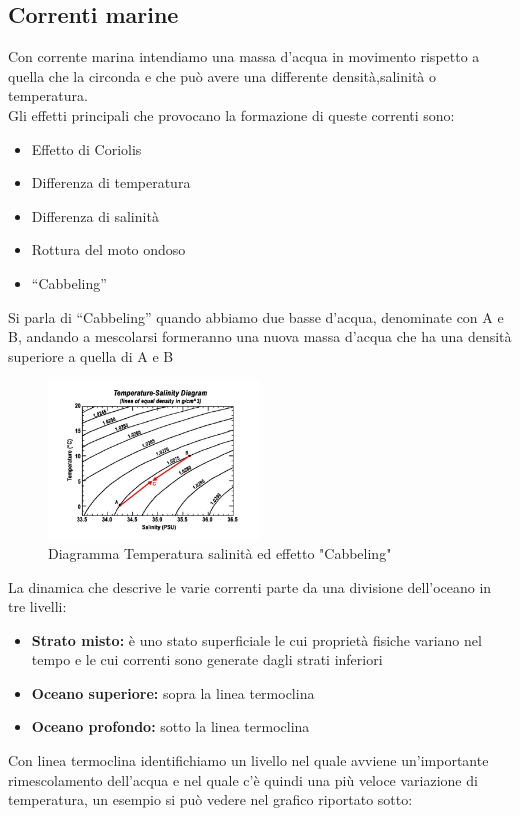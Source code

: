 \subsection{Correnti marine}
Con corrente marina intendiamo una massa d'acqua in movimento rispetto a quella che la circonda e che può avere una differente densità,salinità o temperatura.\\
Gli effetti principali che provocano la formazione di queste correnti sono:\cite{NOAA-current}
\begin{itemize}
    \item Effetto di Coriolis
    \item Differenza di temperatura
    \item Differenza di salinità
    \item Rottura del moto ondoso
    \item \enquote{Cabbeling}
\end{itemize}\noindent
Si parla di \enquote{Cabbeling} quando abbiamo due basse d'acqua, denominate con A e B, andando a mescolarsi formeranno una nuova massa d'acqua che ha una densità superiore a quella di A e B
\begin{figure}[H]
    \centering
    \includegraphics[width=0.5\textwidth]{res/cap 2/temperature-salinity}
    \caption{Diagramma Temperatura salinità ed effetto "Cabbeling"}
\end{figure}\noindent
La dinamica che descrive le varie correnti parte da una divisione dell'oceano in tre livelli:
\begin{itemize}
    \item \textbf{Strato misto:} è uno stato superficiale le cui proprietà fisiche variano nel tempo e le cui correnti sono generate dagli strati inferiori
    \item \textbf{Oceano superiore:} sopra la linea termoclina
    \item \textbf{Oceano profondo:}  sotto la linea termoclina
\end{itemize}\noindent
Con linea termoclina identifichiamo un livello nel quale avviene un'importante rimescolamento dell'acqua e nel quale c'è quindi una più veloce variazione di temperatura, un esempio si può vedere nel grafico riportato sotto:
